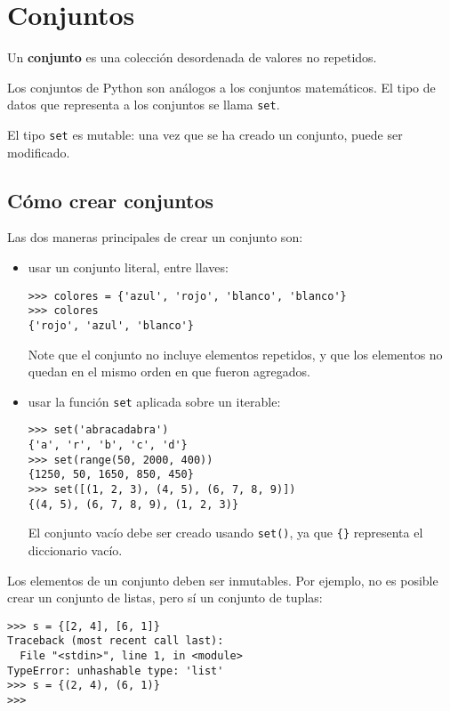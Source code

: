 \section{Conjuntos}

Un \textbf{conjunto} es una colección desordenada de valores no
repetidos.

Los conjuntos de Python son análogos a los conjuntos matemáticos. El
tipo de datos que representa a los conjuntos se llama \lstinline!set!.

El tipo \lstinline!set! es mutable: una vez que se ha creado un
conjunto, puede ser modificado.

\subsection{Cómo crear conjuntos}

Las dos maneras principales de crear un conjunto son:

\begin{itemize}
\item
  usar un conjunto literal, entre llaves:

\begin{lstlisting}
>>> colores = {'azul', 'rojo', 'blanco', 'blanco'}
>>> colores
{'rojo', 'azul', 'blanco'}
\end{lstlisting}

  Note que el conjunto no incluye elementos repetidos, y que los
  elementos no quedan en el mismo orden en que fueron agregados.
\item
  usar la función \lstinline!set! aplicada sobre un iterable:

\begin{lstlisting}
>>> set('abracadabra')
{'a', 'r', 'b', 'c', 'd'}
>>> set(range(50, 2000, 400))
{1250, 50, 1650, 850, 450}
>>> set([(1, 2, 3), (4, 5), (6, 7, 8, 9)])
{(4, 5), (6, 7, 8, 9), (1, 2, 3)}
\end{lstlisting}

  El conjunto vacío debe ser creado usando \lstinline!set()!, ya que
  \lstinline!{}! representa el diccionario vacío.
\end{itemize}

Los elementos de un conjunto deben ser inmutables. Por ejemplo, no es
posible crear un conjunto de listas, pero sí un conjunto de tuplas:

\begin{lstlisting}
>>> s = {[2, 4], [6, 1]}
Traceback (most recent call last):
  File "<stdin>", line 1, in <module>
TypeError: unhashable type: 'list'
>>> s = {(2, 4), (6, 1)}
>>>
\end{lstlisting}

